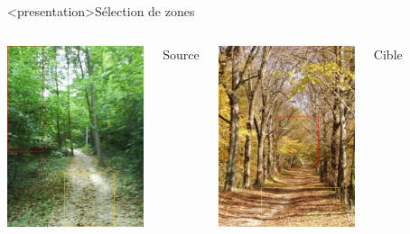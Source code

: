 \begin{frame}<presentation>{Sélection de zones}
  \begin{columns}
    \column{6cm}
    \centering
    \includegraphics[width=4cm]{drawsrc}

    Source

    \column{6cm}
    \centering
    \includegraphics[width=4cm]{drawtgt}

    Cible
  \end{columns}
\end{frame}

